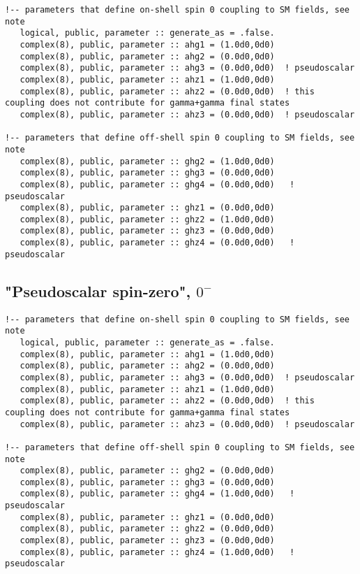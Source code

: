 \documentclass[aps,superscriptaddress,nofootinbib]{revtex4}
\begin{document}
\footnotesize
\begin{verbatim}
!-- parameters that define on-shell spin 0 coupling to SM fields, see note
   logical, public, parameter :: generate_as = .false.
   complex(8), public, parameter :: ahg1 = (1.0d0,0d0)
   complex(8), public, parameter :: ahg2 = (0.0d0,0d0)
   complex(8), public, parameter :: ahg3 = (0.0d0,0d0)  ! pseudoscalar
   complex(8), public, parameter :: ahz1 = (1.0d0,0d0)
   complex(8), public, parameter :: ahz2 = (0.0d0,0d0)  ! this coupling does not contribute for gamma+gamma final states
   complex(8), public, parameter :: ahz3 = (0.0d0,0d0)  ! pseudoscalar

!-- parameters that define off-shell spin 0 coupling to SM fields, see note
   complex(8), public, parameter :: ghg2 = (1.0d0,0d0)
   complex(8), public, parameter :: ghg3 = (0.0d0,0d0)
   complex(8), public, parameter :: ghg4 = (0.0d0,0d0)   ! pseudoscalar
   complex(8), public, parameter :: ghz1 = (0.0d0,0d0)
   complex(8), public, parameter :: ghz2 = (1.0d0,0d0)
   complex(8), public, parameter :: ghz3 = (0.0d0,0d0)
   complex(8), public, parameter :: ghz4 = (0.0d0,0d0)   ! pseudoscalar 
\end{verbatim}
\normalsize

\subsection{"Pseudoscalar spin-zero", $0^-$}

\footnotesize
\begin{verbatim}
!-- parameters that define on-shell spin 0 coupling to SM fields, see note
   logical, public, parameter :: generate_as = .false.
   complex(8), public, parameter :: ahg1 = (1.0d0,0d0)
   complex(8), public, parameter :: ahg2 = (0.0d0,0d0)
   complex(8), public, parameter :: ahg3 = (0.0d0,0d0)  ! pseudoscalar
   complex(8), public, parameter :: ahz1 = (1.0d0,0d0)
   complex(8), public, parameter :: ahz2 = (0.0d0,0d0)  ! this coupling does not contribute for gamma+gamma final states
   complex(8), public, parameter :: ahz3 = (0.0d0,0d0)  ! pseudoscalar

!-- parameters that define off-shell spin 0 coupling to SM fields, see note
   complex(8), public, parameter :: ghg2 = (0.0d0,0d0)
   complex(8), public, parameter :: ghg3 = (0.0d0,0d0)
   complex(8), public, parameter :: ghg4 = (1.0d0,0d0)   ! pseudoscalar
   complex(8), public, parameter :: ghz1 = (0.0d0,0d0)
   complex(8), public, parameter :: ghz2 = (0.0d0,0d0)
   complex(8), public, parameter :: ghz3 = (0.0d0,0d0)
   complex(8), public, parameter :: ghz4 = (1.0d0,0d0)   ! pseudoscalar 
\end{verbatim}
\normalsize
\end{document}
